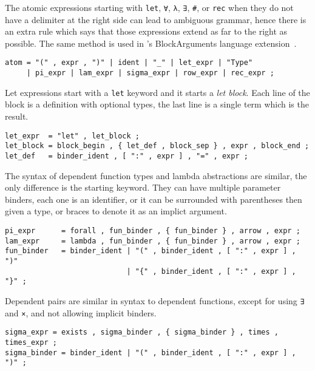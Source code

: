 The atomic expressions starting with \texttt{let},
\texttt{∀}, \texttt{λ},
\texttt{∃}, \texttt{#},
or \texttt{rec} when they do not have a delimiter at
the right side can lead to ambiguous grammar, hence there is an extra rule which
says that those expressions extend as far to the right as possible. The same
method is used in 's BlockArguments language extension~\cite{ghc,
  blockargs}.
\begin{verbatim}
atom = "(" , expr , ")" | ident | "_" | let_expr | "Type"
     | pi_expr | lam_expr | sigma_expr | row_expr | rec_expr ;
\end{verbatim}

Let expressions start with a \texttt{let} keyword
and it starts a \emph{let block}. Each line of the block is a definition with
optional types, the last line is a single term which is the result.
\begin{verbatim}
let_expr  = "let" , let_block ;
let_block = block_begin , { let_def , block_sep } , expr , block_end ;
let_def   = binder_ident , [ ":" , expr ] , "=" , expr ;
\end{verbatim}

The syntax of dependent function types and lambda abstractions are similar, the
only difference is the starting keyword. They can have multiple parameter
binders, each one is an identifier, or it can be surrounded with parentheses
then given a type, or braces to denote it as an implict argument.
\begin{verbatim}
pi_expr      = forall , fun_binder , { fun_binder } , arrow , expr ;
lam_expr     = lambda , fun_binder , { fun_binder } , arrow , expr ;
fun_binder   = binder_ident | "(" , binder_ident , [ ":" , expr ] , ")"
                            | "{" , binder_ident , [ ":" , expr ] , "}" ;
\end{verbatim}

Dependent pairs are similar in syntax to dependent functions, except for using
\texttt{∃} and \texttt{×}, and not allowing implicit binders.
\begin{verbatim}
sigma_expr = exists , sigma_binder , { sigma_binder } , times , times_expr ;
sigma_binder = binder_ident | "(" , binder_ident , [ ":" , expr ] , ")" ;
\end{verbatim}

